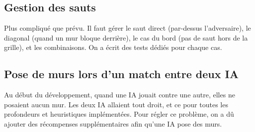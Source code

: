 \documentclass[a4paper, 12pt]{report}
\begin{document}
\subsection{Gestion des sauts}

Plus compliqué que prévu. Il faut gérer le saut direct (par-dessus l'adversaire), le diagonal (quand un mur bloque derrière), le cas du bord (pas de saut hors de la grille), et les combinaisons. On a écrit des tests dédiés pour chaque cas.

\subsection{Pose de murs lors d'un match entre deux IA}
Au début du développement, quand une IA jouait contre une autre, elles ne posaient aucun mur. Les deux IA allaient tout droit, et ce pour toutes les profondeurs et heuristiques implémentées. Pour régler ce problème, on a dû ajouter des récompenses supplémentaires afin qu'une IA pose des murs.
\end{document}
